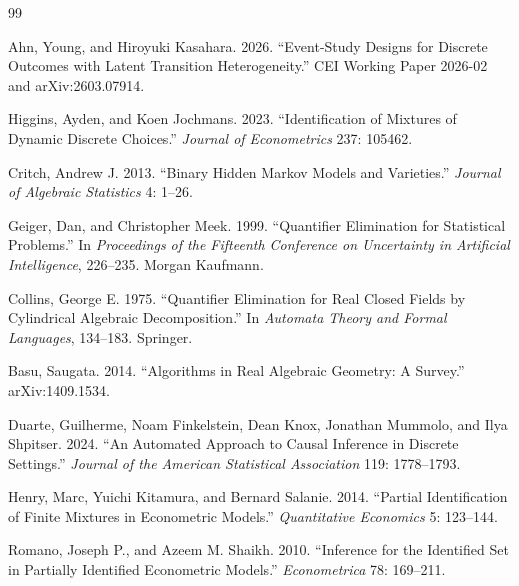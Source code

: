 \documentclass{article}
\begin{document}
\begin{thebibliography}{99}

   Ahn, Young, and Hiroyuki Kasahara. 2026. ``Event-Study Designs for Discrete Outcomes with Latent Transition Heterogeneity.'' CEI Working Paper 2026-02 and arXiv:2603.07914.

   Higgins, Ayden, and Koen Jochmans. 2023. ``Identification of Mixtures of Dynamic Discrete Choices.'' \emph{Journal of Econometrics} 237: 105462.

   Critch, Andrew J. 2013. ``Binary Hidden Markov Models and Varieties.'' \emph{Journal of Algebraic Statistics} 4: 1--26.

   Geiger, Dan, and Christopher Meek. 1999. ``Quantifier Elimination for Statistical Problems.'' In \emph{Proceedings of the Fifteenth Conference on Uncertainty in Artificial Intelligence}, 226--235. Morgan Kaufmann.

   Collins, George E. 1975. ``Quantifier Elimination for Real Closed Fields by Cylindrical Algebraic Decomposition.'' In \emph{Automata Theory and Formal Languages}, 134--183. Springer.

   Basu, Saugata. 2014. ``Algorithms in Real Algebraic Geometry: A Survey.'' arXiv:1409.1534.

   Duarte, Guilherme, Noam Finkelstein, Dean Knox, Jonathan Mummolo, and Ilya Shpitser. 2024. ``An Automated Approach to Causal Inference in Discrete Settings.'' \emph{Journal of the American Statistical Association} 119: 1778--1793.

   Henry, Marc, Yuichi Kitamura, and Bernard Salanie. 2014. ``Partial Identification of Finite Mixtures in Econometric Models.'' \emph{Quantitative Economics} 5: 123--144.

   Romano, Joseph P., and Azeem M. Shaikh. 2010. ``Inference for the Identified Set in Partially Identified Econometric Models.'' \emph{Econometrica} 78: 169--211.

\end{thebibliography}
\end{document}
